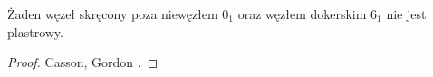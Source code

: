 \begin{proposition}
%
\label{twist_slice}%
    Żaden węzeł skręcony poza niewęzłem $0_1$ oraz węzłem dokerskim $6_1$ nie jest plastrowy.
\end{proposition}

\begin{proof}
    Casson, Gordon \cite{casson1986}.
\end{proof}

%


